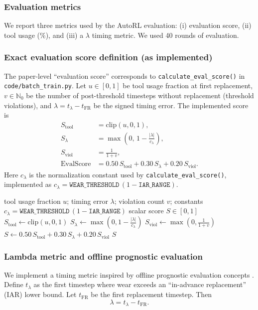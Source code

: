 \documentclass[sn-basic]{sn-jnl} %
\begin{document}
\subsubsection{Evaluation metrics}
We report three metrics used by the AutoRL evaluation: (i) evaluation score, (ii) tool usage (\%), and (iii) a $\lambda$ timing metric. We used 40 rounds of evaluation.

\subsubsection{Exact evaluation score definition (as implemented)}
The paper-level ``evaluation score'' corresponds to \texttt{calculate\_eval\_score()} in \texttt{code/batch\_train.py}. Let $u\in[0,1]$ be tool usage fraction at first replacement, $v\in\mathbb{N}_0$ be the number of post-threshold timesteps without replacement (threshold violations), and $\lambda=t_{\lambda}-t_{\mathrm{FR}}$ be the signed timing error. The implemented score is
\begin{align}
S_{\text{tool}} &= \mathrm{clip}(u,0,1),\\
S_{\lambda} &= \max\left(0,\,1-\frac{|\lambda|}{c_{\lambda}}\right),\\
S_{\text{viol}} &= \frac{1}{1+v},\\
\mathrm{EvalScore} &= 0.50\,S_{\text{tool}} + 0.30\,S_{\lambda} + 0.20\,S_{\text{viol}}.
\end{align}
Here $c_{\lambda}$ is the normalization constant used by \texttt{calculate\_eval\_score()}, implemented as $c_{\lambda}=\texttt{WEAR\_THRESHOLD}\,(1-\texttt{IAR\_RANGE})$.

\begin{algorithm}[t]
\caption{Evaluation score computation (per evaluation run)}
\label{alg:eval_score}
\begin{algorithmic}[1]
\Require tool usage fraction $u$; timing error $\lambda$; violation count $v$; constants $c_{\lambda}=\texttt{WEAR\_THRESHOLD}\,(1-\texttt{IAR\_RANGE})$
\Ensure scalar score $S\in[0,1]$
\State $S_{\mathrm{tool}} \gets \mathrm{clip}(u, 0, 1)$
\State $S_{\lambda} \gets \max\left(0, 1 - \frac{|\lambda|}{c_{\lambda}}\right)$
\State $S_{\mathrm{viol}} \gets \max\left(0, \frac{1}{1+v}\right)$
\State $S \gets 0.50\,S_{\mathrm{tool}} + 0.30\,S_{\lambda} + 0.20\,S_{\mathrm{viol}}$
\State \Return $S$
\end{algorithmic}
\end{algorithm}

\subsubsection{Lambda metric and offline prognostic evaluation}
We implement a timing metric inspired by offline prognostic evaluation concepts \cite{Saxena2010Metrics}. Define $t_{\lambda}$ as the first timestep where wear exceeds an ``in-advance replacement'' (IAR) lower bound. Let $t_{\mathrm{FR}}$ be the first replacement timestep. Then
\begin{equation}
		\lambda = t_{\lambda} - t_{\mathrm{FR}}.
\end{equation}
\end{document}
